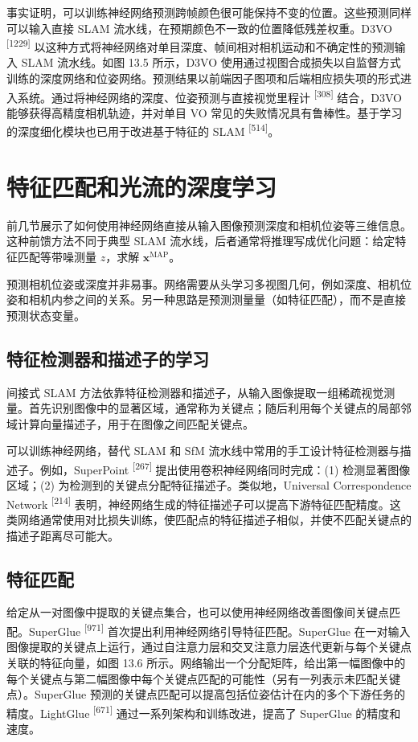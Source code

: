 事实证明，可以训练神经网络预测跨帧颜色很可能保持不变的位置。这些预测同样可以输入直接 SLAM 流水线，在预期颜色不一致的位置降低残差权重。D3VO \textsuperscript{[1229]} 以这种方式将神经网络对单目深度、帧间相对相机运动和不确定性的预测输入 SLAM 流水线。如图 13.5 所示，D3VO 使用通过视图合成损失以自监督方式训练的深度网络和位姿网络。预测结果以前端因子图项和后端相应损失项的形式进入系统。通过将神经网络的深度、位姿预测与直接视觉里程计 \textsuperscript{[308]} 结合，D3VO 能够获得高精度相机轨迹，并对单目 VO 常见的失败情况具有鲁棒性。基于学习的深度细化模块也已用于改进基于特征的 SLAM \textsuperscript{[514]}。

\section{特征匹配和光流的深度学习}

前几节展示了如何使用神经网络直接从输入图像预测深度和相机位姿等三维信息。这种前馈方法不同于典型 SLAM 流水线，后者通常将推理写成优化问题：给定特征匹配等带噪测量 $z$，求解 $\scriptstyle \mathbf { x } ^ { \mathrm { M A P } }$。

预测相机位姿或深度并非易事。网络需要从头学习多视图几何，例如深度、相机位姿和相机内参之间的关系。另一种思路是预测测量量（如特征匹配），而不是直接预测状态变量。

\subsection{特征检测器和描述子的学习}

间接式 SLAM 方法依靠特征检测器和描述子，从输入图像提取一组稀疏视觉测量。首先识别图像中的显著区域，通常称为关键点；随后利用每个关键点的局部邻域计算向量描述子，用于在图像之间匹配关键点。

可以训练神经网络，替代 SLAM 和 SfM 流水线中常用的手工设计特征检测器与描述子。例如，SuperPoint \textsuperscript{[267]} 提出使用卷积神经网络同时完成：(1) 检测显著图像区域；(2) 为检测到的关键点分配特征描述子。类似地，Universal Correspondence Network \textsuperscript{[214]} 表明，神经网络生成的特征描述子可以提高下游特征匹配精度。这类网络通常使用对比损失训练，使匹配点的特征描述子相似，并使不匹配关键点的描述子距离尽可能大。

\subsection{特征匹配}

给定从一对图像中提取的关键点集合，也可以使用神经网络改善图像间关键点匹配。SuperGlue \textsuperscript{[971]} 首次提出利用神经网络引导特征匹配。SuperGlue 在一对输入图像提取的关键点上运行，通过自注意力层和交叉注意力层迭代更新与每个关键点关联的特征向量，如图 13.6 所示。网络输出一个分配矩阵，给出第一幅图像中的每个关键点与第二幅图像中每个关键点匹配的可能性（另有一列表示未匹配关键点）。SuperGlue 预测的关键点匹配可以提高包括位姿估计在内的多个下游任务的精度。LightGlue \textsuperscript{[671]} 通过一系列架构和训练改进，提高了 SuperGlue 的精度和速度。

